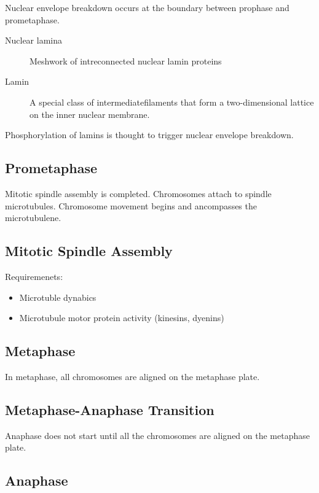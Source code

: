 \documentclass[11pt]{scrartcl}
\begin{document}
Nuclear envelope breakdown occurs at the boundary between prophase and prometaphase.

\begin{description}

\item[Nuclear lamina] Meshwork of intreconnected nuclear lamin proteins
\item[Lamin] A special class of intermediatefilaments that form a
  two-dimensional lattice on the inner nuclear membrane.

\end{description}

Phosphorylation of lamins is thought to trigger nuclear envelope breakdown.

\subsection{Prometaphase}

Mitotic spindle assembly is completed. Chromosomes attach to spindle
microtubules. Chromosome movement begins and ancompasses the
microtubulene.

\subsection{Mitotic Spindle Assembly}

Requiremenets:
\begin{itemize}
\item Microtuble dynabics
\item Microtubule motor protein activity (kinesins, dyenins)
\end{itemize}

\subsection{Metaphase}

In metaphase, all chromosomes are aligned on the metaphase plate.

\subsection{Metaphase-Anaphase Transition}

Anaphase does not start until all the chromosomes are aligned on the
metaphase plate.

\subsection{Anaphase}
\end{document}
